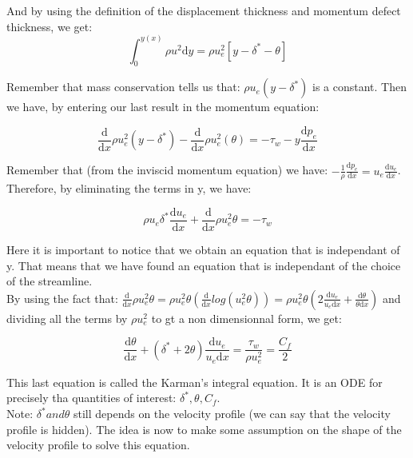 And by using the definition of the displacement thickness and momentum defect thickness, we get:
\begin{equation}
\newcommand{\deriv}{\mathrm{d}}
\int_{0}^{y(x)} \rho u^2 \deriv y=\rho u_e^2[y-\delta^*-\theta]
\end{equation}

Remember that mass conservation tells us that: $\rho u_e(y-\delta^*)$ is a constant. Then we have, by entering our last result in the momentum equation:

\begin{equation}
\newcommand{\deriv}{\mathrm{d}}
\frac{\deriv}{\deriv x} \rho u_e^2(y-\delta^*)- \frac{\deriv}{\deriv x} \rho u_e^2(\theta)=-\tau_w-y \frac{\deriv p_e}{\deriv x} 
\end{equation}

Remember that (from the inviscid momentum equation) we have: $\newcommand{\deriv}{\mathrm{d}}
- \frac{1}{\rho}\frac{\deriv p_e}{\deriv x} = u_e \frac{\deriv u_e}{\deriv x}  $. Therefore, by eliminating the terms in y, we have:

\begin{equation}
\newcommand{\deriv}{\mathrm{d}}
 \rho u_e\delta^* \frac{\deriv u_e}{\deriv x}+ \frac{\deriv}{\deriv x} \rho u_e^2 \theta=-\tau_w
\end{equation}

Here it is important to notice that we obtain an equation that is independant of y. That means that we have found an equation that is independant of the choice of the streamline.\\

By using the fact that: $\newcommand{\deriv}{\mathrm{d}} \frac{\deriv}{\deriv x} \rho u_e^2 \theta = \rho u_e^2 \theta (\frac{\deriv}{\deriv x} log(u_e^2 \theta))=\rho u_e^2 \theta(2\frac{\deriv u_e}{u_e \deriv x}+\frac{\deriv \theta}{\theta \deriv x})$ and dividing all the terms by $\rho u_e^2 $ to gt a non dimensionnal form, we get:

\begin{equation}
\newcommand{\deriv}{\mathrm{d}}
\frac{\deriv \theta}{\deriv x}+(\delta^*+2 \theta)\frac{\deriv u_e}{u_e \deriv x}=\frac{\tau_w}{\rho u_e^2}=\frac{C_f}{2}
\end{equation}

This last equation is called the Karman's integral equation. It is an ODE for precisely tha quantities of interest: $ \delta^*, \theta, C_f$. \\

Note: $\delta ^* and \theta$ still depends on the velocity profile (we can say that the velocity profile is hidden). The idea is now to make some assumption on the shape of the velocity profile to solve this equation.

